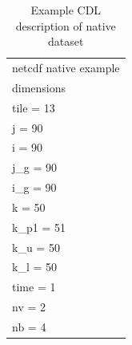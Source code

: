 \begin{longtable}{|p{\textwidth}|}
\caption{Example CDL description of native dataset}
\label{tab:cdl-native} \\
\hline \endhead
\hline \endfoot
netcdf native example\\
dimensions\\
\hline
\rowcolor{YellowGreen}  tile = 13\\
\rowcolor{YellowGreen}  j = 90\\
\rowcolor{YellowGreen}  i = 90\\
\rowcolor{YellowGreen}  j\_g = 90\\
\rowcolor{YellowGreen}  i\_g = 90\\
\rowcolor{YellowGreen}  k = 50\\
\rowcolor{YellowGreen}  k\_p1 = 51\\
\rowcolor{YellowGreen}  k\_u = 50\\
\rowcolor{YellowGreen}  k\_l = 50\\
\rowcolor{YellowGreen}  time = 1\\
\rowcolor{YellowGreen}  nv = 2\\
\rowcolor{YellowGreen}  nb = 4\\
\hline


\end{longtable}

